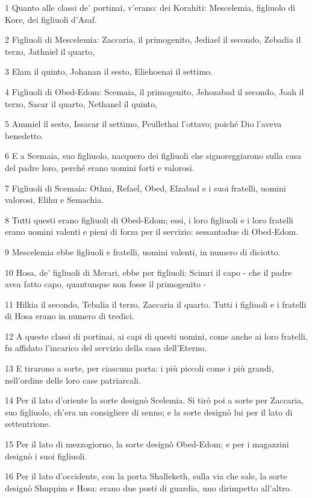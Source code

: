 \par 1 Quanto alle classi de' portinai, v'erano: dei Korahiti: Mescelemia, figliuolo di Kore, dei figliuoli d'Asaf.
\par 2 Figliuoli di Mescelemia: Zaccaria, il primogenito, Jediael il secondo, Zebadia il terzo, Jathniel il quarto,
\par 3 Elam il quinto, Johanan il sesto, Eliehoenai il settimo.
\par 4 Figliuoli di Obed-Edom: Scemaia, il primogenito, Jehozabad il secondo, Joah il terzo, Sacar il quarto, Nethanel il quinto,
\par 5 Ammiel il sesto, Issacar il settimo, Peullethai l'ottavo; poiché Dio l'aveva benedetto.
\par 6 E a Scemaia, suo figliuolo, nacquero dei figliuoli che signoreggiarono sulla casa del padre loro, perché erano uomini forti e valorosi.
\par 7 Figliuoli di Scemaia: Othni, Refael, Obed, Elzabad e i suoi fratelli, uomini valorosi, Elihu e Semachia.
\par 8 Tutti questi erano figliuoli di Obed-Edom; essi, i loro figliuoli e i loro fratelli erano uomini valenti e pieni di forza per il servizio: sessantadue di Obed-Edom.
\par 9 Mescelemia ebbe figliuoli e fratelli, uomini valenti, in numero di diciotto.
\par 10 Hosa, de' figliuoli di Merari, ebbe per figliuoli: Scimri il capo - che il padre avea fatto capo, quantunque non fosse il primogenito -
\par 11 Hilkia il secondo, Tebalia il terzo, Zaccaria il quarto. Tutti i figliuoli e i fratelli di Hosa erano in numero di tredici.
\par 12 A queste classi di portinai, ai capi di questi uomini, come anche ai loro fratelli, fu affidato l'incarico del servizio della casa dell'Eterno.
\par 13 E tirarono a sorte, per ciascuna porta: i più piccoli come i più grandi, nell'ordine delle loro case patriarcali.
\par 14 Per il lato d'oriente la sorte designò Scelemia. Si tirò poi a sorte per Zaccaria, suo figliuolo, ch'era un consigliere di senno; e la sorte designò lui per il lato di settentrione.
\par 15 Per il lato di mezzogiorno, la sorte designò Obed-Edom; e per i magazzini designò i suoi figliuoli.
\par 16 Per il lato d'occidente, con la porta Shalleketh, sulla via che sale, la sorte designò Shuppim e Hosa: erano due posti di guardia, uno dirimpetto all'altro.
